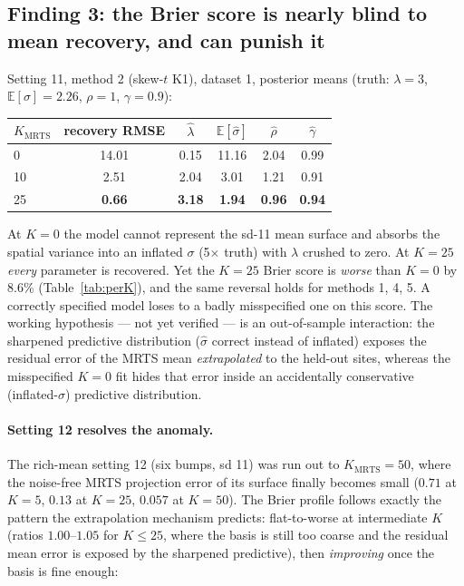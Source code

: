 \documentclass[11pt]{article}
\newcommand{\E}{\mathbb{E}}
\newcommand{\Kmrts}{K_{\mathrm{MRTS}}}
\begin{document}
\subsection{Finding 3: the Brier score is nearly blind to mean recovery, and
can punish it}\label{sec:anomaly}

Setting 11, method 2 (skew-$t$ K1), dataset 1, posterior means
(truth: $\lambda = 3$, $\E[\sigma] = 2.26$, $\rho = 1$, $\gamma = 0.9$):

\begin{center}\small
\begin{tabular}{lccccc}
\toprule
$\Kmrts$ & recovery RMSE & $\hat\lambda$ & $\E[\hat\sigma]$ & $\hat\rho$ & $\hat\gamma$ \\
\midrule
0  & 14.01 & 0.15 & 11.16 & 2.04 & 0.99 \\
10 & 2.51  & 2.04 & 3.01  & 1.21 & 0.91 \\
25 & \textbf{0.66} & \textbf{3.18} & \textbf{1.94} & \textbf{0.96} & \textbf{0.94} \\
\bottomrule
\end{tabular}
\end{center}

At $K=0$ the model cannot represent the sd-11 mean surface and absorbs the
spatial variance into an inflated $\sigma$ (5$\times$ truth) with $\lambda$
crushed to zero. At $K=25$ \emph{every} parameter is recovered. Yet the $K=25$
Brier score is \emph{worse} than $K=0$ by 8.6\% (Table~\ref{tab:perK}), and the
same reversal holds for methods 1, 4, 5. A correctly specified model loses to a
badly misspecified one on this score. The working hypothesis --- not yet
verified --- is an out-of-sample interaction: the sharpened predictive
distribution ($\hat\sigma$ correct instead of inflated) exposes the residual
error of the MRTS mean \emph{extrapolated} to the held-out sites, whereas the
misspecified $K=0$ fit hides that error inside an accidentally conservative
(inflated-$\sigma$) predictive distribution.

\paragraph{Setting 12 resolves the anomaly.}
The rich-mean setting 12 (six bumps, sd 11) was run out to $\Kmrts = 50$,
where the noise-free MRTS projection error of its surface finally becomes
small ($0.71$ at $K=5$, $0.13$ at $K=25$, $0.057$ at $K=50$).
The Brier profile follows exactly the pattern the extrapolation mechanism
predicts: flat-to-worse at intermediate $K$ (ratios $1.00$--$1.05$ for
$K \le 25$, where the basis is still too coarse and the residual mean error is
exposed by the sharpened predictive), then \emph{improving} once the basis is
fine enough:
\end{document}
